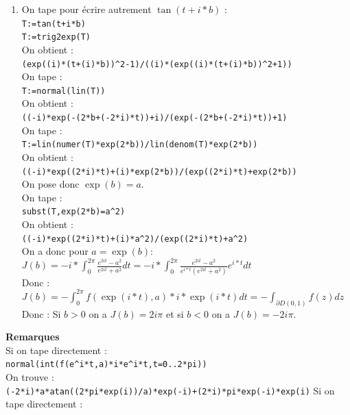 \documentclass[a4paper,11pt]{book}
\newcommand{\R}{{\mathbb{R}}}
\newcommand{\Z}{{\mathbb{Z}}}
\begin{document}
\begin{enumerate}
{\tt [pi/2,(-pi)/2]}\\
Donc les les p\^oles de la fonction $t(z)=\tan(z)$ sont $\frac{\pi}{2}+k\pi$ 
avec $k\in\Z$.
Donc  si $b\in \R$ et $b\neq 0$ l'int\'egrale $J(b)=\int_0^{2\pi}\tan(t+ib)dt$ 
existe car les p\^oles de $\tan(z)$ sont en dehors de l'axe r\'eel.
\item On tape pour \'ecrire autrement $\tan(t+i*b)$ :\\
{\tt T:=tan(t+i*b)}\\
{\tt T:=trig2exp(T)}\\
On obtient :\\
{\tt (exp((i)*(t+(i)*b))\verb|^|2-1)/((i)*(exp((i)*(t+(i)*b))\verb|^|2+1))}\\
On tape :\\
{\tt T:=normal(lin(T))}\\
On obtient :\\
{\tt ((-i)*exp(-(2*b+(-2*i)*t))+i)/(exp(-(2*b+(-2*i)*t))+1)}\\
On tape :\\
{\tt T:=lin(numer(T)*exp(2*b))/lin(denom(T)*exp(2*b))}\\
On obtient :\\
{\tt ((-i)*exp((2*i)*t)+(i)*exp(2*b))/(exp((2*i)*t)+exp(2*b))}\\
On pose donc $\exp(b)=a$.\\
On tape :\\
{\tt subst(T,exp(2*b)=a\verb|^|2)}\\
On obtient :\\
{\tt ((-i)*exp((2*i)*t)+(i)*a\verb|^|2)/(exp((2*i)*t)+a\verb|^|2)}\\
On a donc pour $a=\exp(b)$:\\
$\displaystyle J(b)=-i*\int_0^{2\pi}\frac{e^{2it}-a^2}{e^{2it}+a^2}dt=-i*\int_0^{2\pi}\frac{e^{2it}-a^2}{e^{i*t}(e^{2it}+a^2)}e^{i*t}dt$\\
Donc :\\
$\displaystyle J(b)=-\int_0^{2\pi}f(\exp(i*t),a)*i*\exp(i*t)dt=-\int_{\partial D(0,1)} f(z)dz$\\
Donc :
Si $b>0$ on a $J(b)=2i\pi$ et si $b<0$ on a $ J(b)=-2i\pi$.
\end{enumerate}
{\bf Remarques}\\
Si on tape directement :\\
{\tt normal(int(f(e\verb|^|i*t,a)*i*e\verb|^|i*t,t=0..2*pi))}\\
On trouve :\\
{\tt (-2*i)*a*atan((2*pi*exp(i))/a)*exp(-i)+(2*i)*pi*exp(-i)*exp(i)}
Si on tape directement :\\
\end{document}
